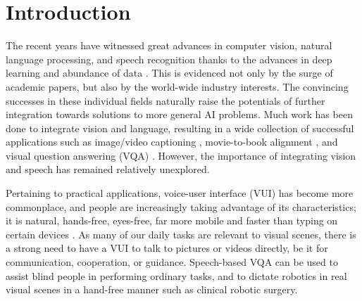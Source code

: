 \documentclass[letterpaper]{article} %
\begin{document}
\section{Introduction}
The recent years have witnessed great advances in computer vision, natural language processing, and speech recognition thanks to the advances in deep learning \cite{lecun2015deep} and abundance of data \cite{imagenet:2015}. This is evidenced not only by the surge of academic papers, but also by the world-wide industry interests. The convincing successes in these individual fields naturally raise the potentials of further integration towards solutions to more general AI problems. Much work has been done to integrate vision and language, resulting in a wide collection of successful applications such as image/video captioning \cite{show:tell:caption}, movie-to-book alignment \cite{align:bookmovie}, and visual question answering (VQA) \cite{VQA}. However, the importance of integrating vision and speech has remained relatively unexplored.

Pertaining to practical applications, voice-user interface (VUI) has become more commonplace, and people are increasingly taking advantage of its characteristics; it is natural, hands-free, eyes-free, far more mobile and faster than typing on certain devices \cite{speech:faster}. As many of our daily tasks are relevant to visual scenes, there is a strong need to have a VUI to talk to pictures or videos directly, be it for communication, cooperation, or guidance. Speech-based VQA can be used to assist blind people in performing ordinary tasks, and to dictate robotics in real visual scenes in a hand-free manner such as clinical robotic surgery.
\end{document}
